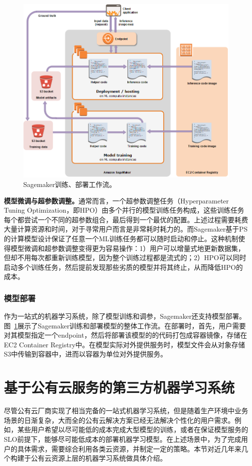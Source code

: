 \begin{figure}[h]
    \centerline{\includegraphics[width=\textwidth]{figures/sagemaker-architecture.png}}
    \caption{Sagemaker训练、部署工作流。}
    \label{sagemaker_train_serving}
\end{figure}

\textbf{模型微调与超参数调整。}通常而言，一个超参数调整任务（Hyperparameter Tuning Optimization，即HPO）\parencite{bardenet2013collaborative}由多个并行的模型训练任务构成，这些训练任务每个都尝试一个不同的超参数组合，最后得到一个最优的配置。上述过程需要耗费大量计算资源和时间，对于寻常用户而言是非常耗时耗力的。而Sagemaker基于PS的计算模型设计保证了任意一个ML训练任务都可以随时启动和停止。这种机制使得模型微调和超参数调整变得更为容易操作：1）用户可以增量式地更新数据集，但却不用每次都重新训练模型，因为整个训练过程都是流式的；2）HPO可以同时启动多个训练任务，然后提前发现那些劣质的模型并将其终止，从而降低HPO的成本。

\subsubsection{模型部署}
作为一站式的机器学习系统，除了模型训练和调参，Sagemaker还支持模型部署。图~\ref{sagemaker_train_serving}展示了Sagemaker训练和部署模型的整体工作流。在部署时，首先，用户需要对其模型指定一个endpoint，然后将部署该模型的的代码打包成容器镜像，存储在EC2 Container Registry中。在模型实际对外提供服务时，模型文件会从对象存储S3中传输到容器中，进而以容器为单位对外提供服务。

\section{基于公有云服务的第三方机器学习系统}
尽管公有云厂商实现了相当完备的一站式机器学习系统，但是随着生产环境中业务场景的日渐复杂，大而全的公有云解决方案已经无法解决个性化的用户需求。例如，某些用户希望以尽可能低的成本完成大型模型的训练，或者在保证模型服务的SLO前提下，能够尽可能低成本的部署机器学习模型。在上述场景中，为了完成用户的具体需求，需要综合利用各类云资源，并制定一定的策略。本节对近几年来几个构建于公有云资源上层的机器学习系统做具体介绍。
